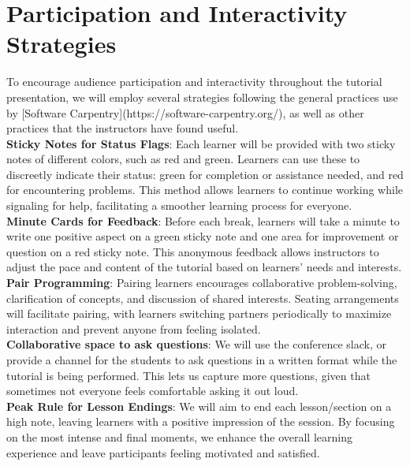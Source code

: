 \documentclass[sigconf]{acmart}
\begin{document}
\section{Participation and Interactivity Strategies}

To encourage audience participation and interactivity throughout the tutorial 
presentation, we will employ several strategies following the general practices 
use by [Software Carpentry](https://software-carpentry.org/), as well as other 
practices that the instructors have found useful. \\

\textbf{Sticky Notes for Status Flags}: Each learner will be provided with two 
sticky notes of different colors, such as red and green. Learners can use these 
to discreetly indicate their status: green for completion or assistance needed, 
and red for encountering problems. This method allows learners to continue 
working while signaling for help, facilitating a smoother learning process for 
everyone. \\

\textbf{Minute Cards for Feedback}: Before each break, learners will take a minute 
to write one positive aspect on a green sticky note and one area for improvement 
or question on a red sticky note. This anonymous feedback allows instructors to 
adjust the pace and content of the tutorial based on learners' needs and interests. \\

\textbf{Pair Programming}: Pairing learners encourages collaborative problem-solving, 
clarification of concepts, and discussion of shared interests. Seating arrangements 
will facilitate pairing, with learners switching partners periodically to maximize
interaction and prevent anyone from feeling isolated. \\

\textbf{Collaborative space to ask questions}: We will use the conference slack, or 
provide a channel for the students to ask questions in a written format while the 
tutorial is being performed. This lets us capture more questions, given that 
sometimes not everyone feels comfortable asking it out loud. \\

\textbf{Peak Rule for Lesson Endings}: We will aim to end each lesson/section on a 
high note, leaving learners with a positive impression of the session. By focusing
on the most intense and final moments, we enhance the overall learning experience
and leave participants feeling motivated and satisfied. \\
\end{document}
